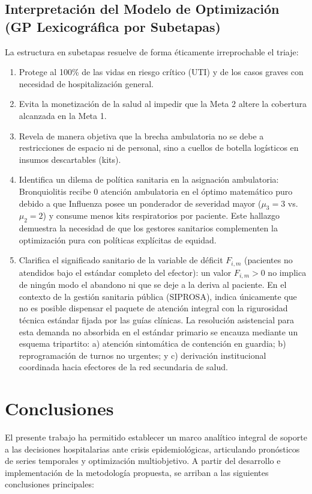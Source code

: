 \documentclass[conference]{IEEEtran}
\begin{document}
\subsection{Interpretación del Modelo de Optimización (GP Lexicográfica por Subetapas)}
La estructura en subetapas resuelve de forma éticamente irreprochable el triaje:
\begin{enumerate}
    \item Protege al 100\% de las vidas en riesgo crítico (UTI) y de los casos graves con necesidad de hospitalización general.
    \item Evita la monetización de la salud al impedir que la Meta 2 altere la cobertura alcanzada en la Meta 1.
    \item Revela de manera objetiva que la brecha ambulatoria no se debe a restricciones de espacio ni de personal, sino a cuellos de botella logísticos en insumos descartables (kits).
    \item Identifica un dilema de política sanitaria en la asignación ambulatoria: Bronquiolitis recibe 0 atención ambulatoria en el óptimo matemático puro debido a que Influenza posee un ponderador de severidad mayor ($\mu_3 = 3$ vs. $\mu_2 = 2$) y consume menos kits respiratorios por paciente. Este hallazgo demuestra la necesidad de que los gestores sanitarios complementen la optimización pura con políticas explícitas de equidad.
    \item Clarifica el significado sanitario de la variable de déficit $F_{i,m}$ (pacientes no atendidos bajo el estándar completo del efector): un valor $F_{i,m} > 0$ no implica de ningún modo el abandono ni que se deje a la deriva al paciente. En el contexto de la gestión sanitaria pública (SIPROSA), indica únicamente que no es posible dispensar el paquete de atención integral con la rigurosidad técnica estándar fijada por las guías clínicas. La resolución asistencial para esta demanda no absorbida en el estándar primario se encauza mediante un esquema tripartito: a) atención sintomática de contención en guardia; b) reprogramación de turnos no urgentes; y c) derivación institucional coordinada hacia efectores de la red secundaria de salud.
\end{enumerate}

\section{Conclusiones}

El presente trabajo ha permitido establecer un marco analítico integral de soporte a las decisiones hospitalarias ante crisis epidemiológicas, articulando pronósticos de series temporales y optimización multiobjetivo. A partir del desarrollo e implementación de la metodología propuesta, se arriban a las siguientes conclusiones principales:
\end{document}
